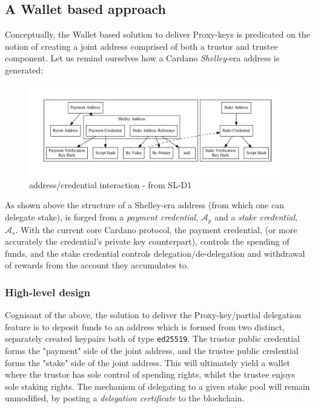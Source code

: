 \documentclass[11pt,a4paper]{article}
\begin{document}
\pagebreak

\subsection{A Wallet based approach}
Conceptually, the Wallet based solution to deliver Proxy-keys is predicated on the notion of creating a 
\gls{joint address} comprised of both a \gls{trustor} and \gls{trustee} component. Let us remind ourselves how 
a Cardano \emph{Shelley}-era address is generated:

\begin{figure}[ht]
  \includegraphics[width=\linewidth]{images/addresses.pdf}
  \caption{address/credential interaction - from SL-D1}
  \label{fig:addresses}
\end{figure}

As shown above the structure of a Shelley-era address (from which one can delegate stake), is forged from a 
\emph{payment credential}, $\mathcal{A}_p$ and a \emph{stake credential}, $\mathcal{A}_s$. With the current 
core Cardano protocol, the payment credential, (or more accurately the credential's private key counterpart), 
controls the spending of funds, and the stake credential controls delegation/de-delegation and withdrawal of 
rewards from the account they accumulates to. \\

\subsubsection{High-level design}
Cognisant of the above, the solution to deliver the Proxy-key/partial delegation feature is to deposit funds
to an address which is formed from two distinct, separately created keypairs both of type \lstinline{ed25519}.
The \gls{trustor} public credential forms the "payment" side of the \gls{joint address}, and the 
\gls{trustee} public credential forms the "stake" side of the \gls{joint address}. This will ultimately yield
a wallet where the \gls{trustor} has sole control of spending rights, whilst the \gls{trustee} enjoys sole
staking rights. The mechanism of delegating to a given stake pool will remain unmodified, by posting a \emph{delegation 
certificate} to the blockchain. \\
\end{document}
